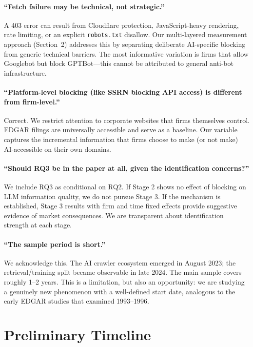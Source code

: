 \documentclass[12pt,a4paper]{article}
\begin{document}
\paragraph{``Fetch failure may be technical, not strategic.''} A 403 error can result from Cloudflare protection, JavaScript-heavy rendering, rate limiting, or an explicit \texttt{robots.txt} disallow. Our multi-layered measurement approach (Section~2) addresses this by separating deliberate AI-specific blocking from generic technical barriers. The most informative variation is firms that allow Googlebot but block GPTBot---this cannot be attributed to general anti-bot infrastructure.

\paragraph{``Platform-level blocking (like SSRN blocking API access) is different from firm-level.''} Correct. We restrict attention to corporate websites that firms themselves control. EDGAR filings are universally accessible and serve as a baseline. Our variable captures the incremental information that firms choose to make (or not make) AI-accessible on their own domains.

\paragraph{``Should RQ3 be in the paper at all, given the identification concerns?''} We include RQ3 as conditional on RQ2. If Stage 2 shows no effect of blocking on LLM information quality, we do not pursue Stage 3. If the mechanism is established, Stage 3 results with firm and time fixed effects provide suggestive evidence of market consequences. We are transparent about identification strength at each stage.

\paragraph{``The sample period is short.''} We acknowledge this. The AI crawler ecosystem emerged in August 2023; the retrieval/training split became observable in late 2024. The main sample covers roughly 1--2 years. This is a limitation, but also an opportunity: we are studying a genuinely new phenomenon with a well-defined start date, analogous to the early EDGAR studies that examined 1993--1996.

\section{Preliminary Timeline}
\end{document}
